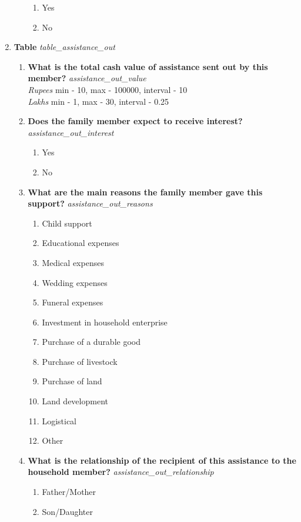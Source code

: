 \documentclass{article}
\begin{document}
\begin{enumerate}
\begin{enumerate}[label*=\arabic*.]
\begin{enumerate} 
\item Yes 
\item No 
\end{enumerate} 
\end{enumerate} 
\item {\bfseries Table}\emph{ table\_assistance\_out } 
\begin{enumerate}[label*=\arabic*.] 
\item {\bfseries What is the total cash value of assistance sent out by this member?}\emph{ assistance\_out\_value } 
\\ \emph{ Rupees }min - 10, max - 100000, interval - 10 
\\ \emph{ Lakhs }min - 1, max - 30, interval - 0.25 
 
\item {\bfseries Does the family member expect to receive interest?}\emph{ assistance\_out\_interest } 
\begin{enumerate} 
\item Yes 
\item No 
\end{enumerate} 
\item {\bfseries What are the main reasons the family member gave this support?}\emph{ assistance\_out\_reasons } 
\begin{enumerate} 
\item Child support 
\item Educational expenses 
\item Medical expenses 
\item Wedding expenses 
\item Funeral expenses 
\item Investment in household enterprise 
\item Purchase of a durable good 
\item Purchase of livestock 
\item Purchase of land 
\item Land development 
\item Logistical 
\item Other 
\end{enumerate} 
\item {\bfseries What is the relationship of the recipient of this assistance to the household member?}\emph{ assistance\_out\_relationship } 
\begin{enumerate} 
\item Father/Mother 
\item Son/Daughter 

\end{enumerate}
\end{enumerate}
\end{enumerate}
\end{document}
